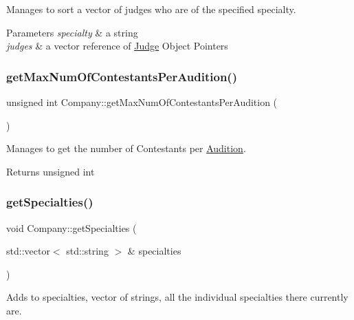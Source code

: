 Manages to sort a vector of judges who are of the specified specialty. 


\begin{DoxyParams}{Parameters}
{\em specialty} & a string \\
\hline
{\em judges} & a vector reference of \hyperlink{class_judge}{Judge} Object Pointers \\
\hline
\end{DoxyParams}
\mbox{\label{class_company_a7631d2e0b84275b8f8cab27e3dad0473}} 
\subsubsection{\texorpdfstring{get\+Max\+Num\+Of\+Contestants\+Per\+Audition()}{getMaxNumOfContestantsPerAudition()}}
{\footnotesize\ttfamily unsigned int Company\+::get\+Max\+Num\+Of\+Contestants\+Per\+Audition (\begin{DoxyParamCaption}{ }\end{DoxyParamCaption})}



Manages to get the number of Contestants per \hyperlink{class_audition}{Audition}. 

\begin{DoxyReturn}{Returns}
unsigned int 
\end{DoxyReturn}
\mbox{\label{class_company_aab93a983bbd590e540b439033c9ec723}} 
\subsubsection{\texorpdfstring{get\+Specialties()}{getSpecialties()}}
{\footnotesize\ttfamily void Company\+::get\+Specialties (\begin{DoxyParamCaption}\item[{std\+::vector$<$ std\+::string $>$ \&}]{specialties }\end{DoxyParamCaption})}



Adds to specialties, vector of strings, all the individual specialties there currently are. 



